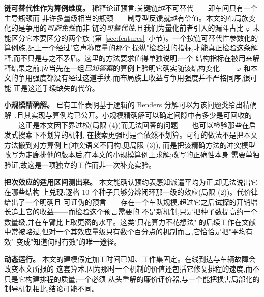 \documentclass[manuscript,screen,review]{acmart}
\newcommand{\NSeeds}{10}
\begin{document}
\textbf{链可替代性作为算例维度。} 稀释论证预言:关键链越不可替代——即车间只有一个主导瓶颈而
非许多量级相当的瓶颈——制导型反馈就越有价值。本文的布局族变化的是争用的\emph{可避免性}而非
链的\emph{可替代性},且我们为量化前者引入的漏斗占比 $\varphi$ 未能区分它本要区分的两个族
(第~\ref{sec:features}~小节)。一个按链可替代性参数化的算例族,配上一个经过"它声称度量的那个
操纵"检验过的指标,才能真正检验这条解释,而不只是与之不矛盾。这里的方法要求值得单独说明:一个
结构指标在被用来解释结果之前,应当先在一组\emph{已知答案}的算例上验明它确实随该结构变化——
$\varphi$ 和本文的争用强度都没有经过这道手续,而布局族上收益与争用强度并不严格同序,很可能
正是这道手续缺失的代价。

\textbf{小规模精确解。} 已有工作表明基于逻辑的 Benders 分解可以为该问题类给出精确
解~\cite{vanos2026exact},且其实现与算例均已公开。小规模精确解可以确定间隙中有多少是可回收的
——这正是本文因下界过松(局限 (4))而无法回答的问题——也可以检验那些在启发式搜索下不划算的机制,
在搜索更强时是否依然不划算。可行的做法不是把本文方法搬到对方算例上(冲突语义不同构,见局限 (3)),
而是把该精确方法的冲突模型改写为走廊排他的版本后,在本文的小规模算例上求解;改写的正确性本身
需要单独验证,故这是一项独立的工作而非一次补充实验。

\textbf{把次效应的适用区间测出来。} 本文能确认预约表感知派遣平均为正,却无法说出它在哪些结构
上兑现:逐格 \NSeeds{} 个种子只够分辨闭环那一级的效应(局限 (2))。代价律给出了一个明确且
可证伪的预言——存在一个车队规模,超过它之后试探的开销增长追上它的收益——而检验这个预言需要的
不是新机制,只是把种子数提高约一个数量级,并在车臂比上取更密的水平。这类"只花算力不花想法"
的后续工作在文献中常被略过,但对一个其效应量级只有数个百分点的机制而言,它恰恰是把"平均有效"
变成"知道何时有效"的唯一途径。

\textbf{动态运行。} 本文的建模假定加工时间已知、工件集固定。在线到达与车辆故障会改变本文所报的
这套算术,因为那时一个机制的价值还包括它修复排程的速度,而不只是它构建排程的质量;一个必须
从头重解的廉价评价器,与一个能把损害局部化的制导机制相比,结论可能不同。







\end{document}
